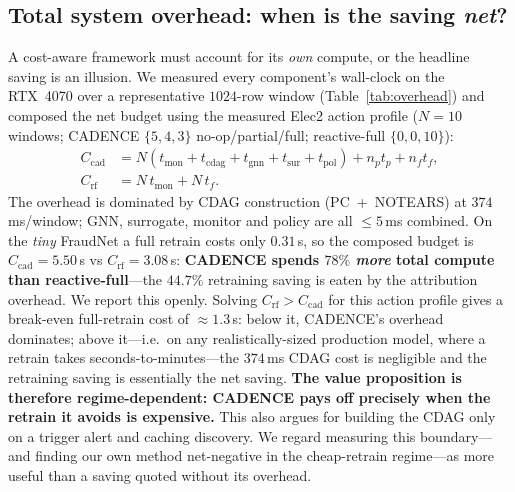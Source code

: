 \documentclass[conference]{IEEEtran}
\begin{document}
\subsection{Total system overhead: when is the saving \emph{net}?}\label{sec:overhead}
A cost-aware framework must account for its \emph{own} compute, or the
headline saving is an illusion. We measured every component's wall-clock on
the RTX~4070 over a representative $1024$-row window
(Table~\ref{tab:overhead}) and composed the net budget using the measured
Elec2 action profile ($N{=}10$ windows; CADENCE $\{5,4,3\}$ no-op/partial/full;
reactive-full $\{0,0,10\}$):
\begin{align}
C_{\text{cad}} &= N(t_{\text{mon}}{+}t_{\text{cdag}}{+}t_{\text{gnn}}{+}t_{\text{sur}}{+}t_{\text{pol}}) + n_p t_p + n_f t_f,\nonumber\\
C_{\text{rf}} &= N\,t_{\text{mon}} + N\,t_f .
\end{align}
The overhead is dominated by CDAG construction (PC~+~NOTEARS) at
$374$\,ms/window; GNN, surrogate, monitor and policy are all $\le5$\,ms
combined. On the \emph{tiny} FraudNet a full retrain costs only $0.31$\,s,
so the composed budget is $C_{\text{cad}}{=}5.50$\,s vs
$C_{\text{rf}}{=}3.08$\,s: \textbf{CADENCE spends $78\%$ \emph{more} total
compute than reactive-full}---the $44.7\%$ retraining saving is eaten by the
attribution overhead. We report this openly. Solving $C_{\text{rf}}>C_{\text{cad}}$
for this action profile gives a break-even full-retrain cost of
$\approx\!1.3$\,s: below it, CADENCE's overhead dominates; above it---i.e.\ on
any realistically-sized production model, where a retrain takes
seconds-to-minutes---the $374$\,ms CDAG cost is negligible and the retraining
saving is essentially the net saving. \textbf{The value proposition is
therefore regime-dependent: CADENCE pays off precisely when the retrain it
avoids is expensive.} This also argues for building the CDAG only on a
trigger alert and caching discovery. We regard measuring this boundary---and
finding our own method net-negative in the cheap-retrain regime---as more
useful than a saving quoted without its overhead.
\end{document}
